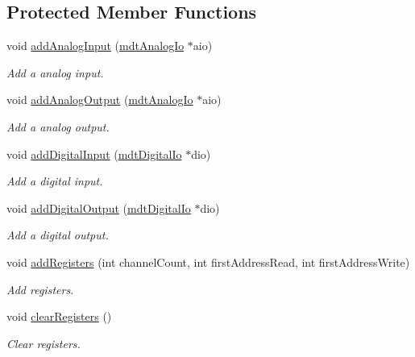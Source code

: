\subsection*{Protected Member Functions}
\begin{DoxyCompactItemize}
\item 
void \hyperlink{classmdt_device_modbus_wago_module_aec3bf9299744d0263339d7d419955154}{add\-Analog\-Input} (\hyperlink{classmdt_analog_io}{mdt\-Analog\-Io} $\ast$aio)
\begin{DoxyCompactList}\small\item\em Add a analog input. \end{DoxyCompactList}\item 
void \hyperlink{classmdt_device_modbus_wago_module_a382ba4bf293bce7c63ee861aebb71b4e}{add\-Analog\-Output} (\hyperlink{classmdt_analog_io}{mdt\-Analog\-Io} $\ast$aio)
\begin{DoxyCompactList}\small\item\em Add a analog output. \end{DoxyCompactList}\item 
void \hyperlink{classmdt_device_modbus_wago_module_aaca2ca0616e03c49bc84b3277ec79f4a}{add\-Digital\-Input} (\hyperlink{classmdt_digital_io}{mdt\-Digital\-Io} $\ast$dio)
\begin{DoxyCompactList}\small\item\em Add a digital input. \end{DoxyCompactList}\item 
void \hyperlink{classmdt_device_modbus_wago_module_a575536bfe7381d7c6ece4552923b0129}{add\-Digital\-Output} (\hyperlink{classmdt_digital_io}{mdt\-Digital\-Io} $\ast$dio)
\begin{DoxyCompactList}\small\item\em Add a digital output. \end{DoxyCompactList}\item 
void \hyperlink{classmdt_device_modbus_wago_module_ad803f3aa8d9777feaa5cdb3a4cccd316}{add\-Registers} (int channel\-Count, int first\-Address\-Read, int first\-Address\-Write)
\begin{DoxyCompactList}\small\item\em Add registers. \end{DoxyCompactList}\item 
void \hyperlink{classmdt_device_modbus_wago_module_a4c972b61d55abfc249c02fbe7b3dbb9c}{clear\-Registers} ()
\begin{DoxyCompactList}\small\item\em Clear registers. \end{DoxyCompactList}\item 

\end{DoxyCompactItemize}
